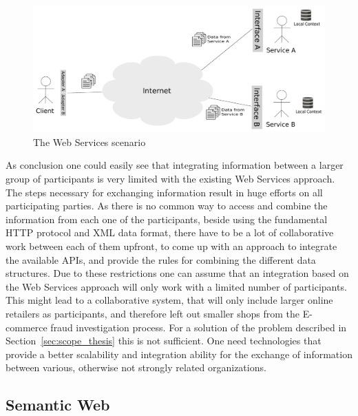 \begin{figure}[H]
  \centering
  \includegraphics[width=0.9\columnwidth]{images/web-services-scenario.pdf}
  \caption{The Web Services scenario}
\label{fig:web_services_scenario}
\end{figure}

As conclusion one could easily see that integrating information between a larger group of participants is very limited with the existing Web Services approach. The steps necessary for exchanging information result in huge efforts on all participating parties. As there is no common way to access and combine the information from each one of the participants, beside using the fundamental \gls{HTTP} protocol and \gls{XML} data format, there have to be a lot of collaborative work between each of them upfront, to come up with an approach to integrate the available \gls{API}s, and provide the rules for combining the different data structures. Due to these restrictions one can assume that an integration based on the Web Services approach will only work with a limited number of participants. This might lead to a collaborative system, that will only include larger online retailers as participants, and therefore left out smaller shops from the \gls{E-commerce} fraud investigation process. For a solution of the problem described in Section~\ref{sec:scope_thesis} this is not sufficient. One need technologies that provide a better scalability and integration ability for the exchange of information between various, otherwise not strongly related organizations.


\subsection{Semantic Web}
\label{subsec:web_data}

